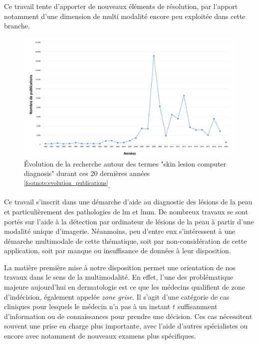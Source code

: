 Ce travail tente d'apporter de nouveaux éléments de résolution, par l’apport notamment d’une dimension de multi modalité encore peu exploitée dans cette branche. 
\begin{figure}[H]
    \centering
    \includegraphics[width=\linewidth]{contents/i_introduction/resources/evolution_publications.pdf}
    \caption{Évolution de la recherche autour des termes "skin lesion computer diagnosis" durant ces 20 dernières années \textsuperscript{\ref{footnote:evolution_publications}}.}
    \label{fig:evolution_publications}
\end{figure}\par
\addtocounter{footnote}{1}

Ce travail s'inscrit dans une démarche d'aide au diagnostic des lésions de la peau et particulièrement des pathologies de \gls{lm} et \gls{lmm}. De nombreux travaux se sont portés sur l'aide à la détection par ordinateur de lésions de la peau à partir d'une modalité unique d'imagerie. Néanmoins, peu d'entre eux s'intéressent à une démarche multimodale de cette thématique, soit par non-considération de cette application, soit par manque ou insuffisance de données à leur disposition.\par

La matière première mise à notre disposition permet une orientation de nos travaux dans le sens de la multimodalité. En effet, l'une des problématique majeure aujourd'hui en dermatologie est ce que les médecins qualifient de zone d'indécision, également appelée \textit{zone grise}. Il s'agit d'une catégorie de cas cliniques pour lesquels le médecin n'a pas à un instant $t$ suffisamment d'information ou de connaissances pour prendre une décision. Ces cas nécessitent souvent une prise en charge plus importante, avec l'aide d'autres spécialistes ou encore avec notamment de nouveaux examens plus spécifiques.\par

